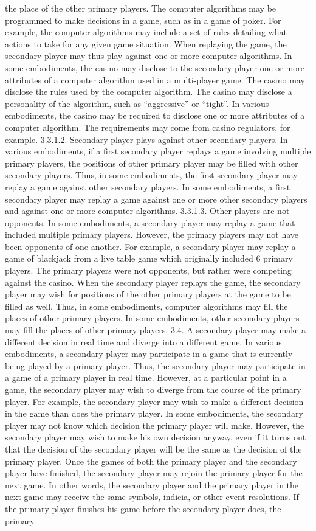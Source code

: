 \documentclass[11pt,a4paper]{article}
\begin{document}
the place of the other primary players. The computer algorithms may be programmed to make decisions in a game, such as in a game of poker. For example, the computer algorithms may include a set of rules detailing what actions to take for any given game situation. When replaying the game, the secondary player may thus play against one or more computer algorithms. In some embodiments, the casino may disclose to the secondary player one or more attributes of a computer algorithm used in a multi-player game. The casino may disclose the rules used by the computer algorithm. The casino may disclose a personality of the algorithm, such as “aggressive” or “tight”. In various embodiments, the casino may be required to disclose one or more attributes of a computer algorithm. The requirements may come from casino regulators, for example. 3.3.1.2. Secondary player plays against other secondary players. In various embodiments, if a first secondary player replays a game involving multiple primary players, the positions of other primary player may be filled with other secondary players. Thus, in some embodiments, the first secondary player may replay a game against other secondary players. In some embodiments, a first secondary player may replay a game against one or more other secondary players and against one or more computer algorithms. 3.3.1.3. Other players are not opponents. In some embodiments, a secondary player may replay a game that included multiple primary players. However, the primary players may not have been opponents of one another. For example, a secondary player may replay a game of blackjack from a live table game which originally included 6 primary players. The primary players were not opponents, but rather were competing against the casino. When the secondary player replays the game, the secondary player may wish for positions of the other primary players at the game to be filled as well. Thus, in some embodiments, computer algorithms may fill the places of other primary players. In some embodiments, other secondary players may fill the places of other primary players. 3.4. A secondary player may make a different decision in real time and diverge into a different game. In various embodiments, a secondary player may participate in a game that is currently being played by a primary player. Thus, the secondary player may participate in a game of a primary player in real time. However, at a particular point in a game, the secondary player may wish to diverge from the course of the primary player. For example, the secondary player may wish to make a different decision in the game than does the primary player. In some embodiments, the secondary player may not know which decision the primary player will make. However, the secondary player may wish to make his own decision anyway, even if it turns out that the decision of the secondary player will be the same as the decision of the primary player. Once the games of both the primary player and the secondary player have finished, the secondary player may rejoin the primary player for the next game. In other words, the secondary player and the primary player in the next game may receive the same symbols, indicia, or other event resolutions. If the primary player finishes his game before the secondary player does, the primary 
\end{document}
